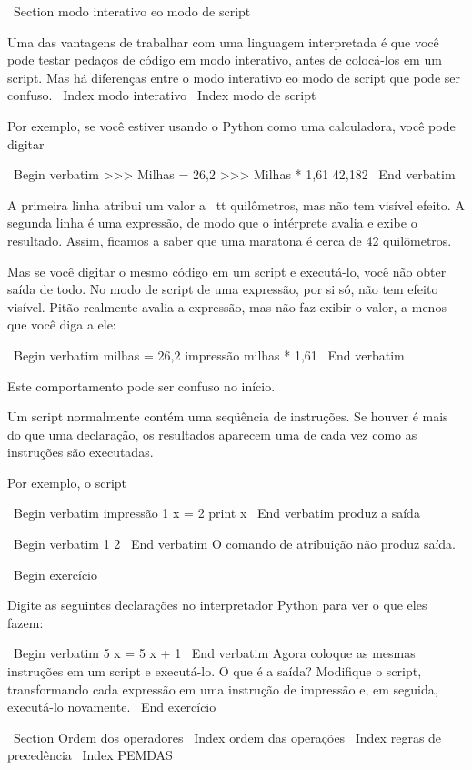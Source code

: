 \documentclass[10pt]{book}
\begin{document}
{\ Section {modo interativo eo modo de script}

Uma das vantagens de trabalhar com uma linguagem interpretada é que
você pode testar pedaços de código em modo interativo, antes de colocá-los
em um script. Mas há diferenças entre o modo interativo
eo modo de script que pode ser confuso.
\ Index {modo interativo}
\ Index {modo de script}

Por exemplo, se você estiver usando o Python como uma calculadora, você pode digitar

\ Begin {verbatim}
>>> Milhas = 26,2
>>> Milhas * 1,61
42,182
\ End {verbatim}

A primeira linha atribui um valor a {\ tt quilômetros}, mas não tem visível
efeito. A segunda linha é uma expressão, de modo que o intérprete
avalia e exibe o resultado. Assim, ficamos a saber que uma maratona é
cerca de 42 quilômetros.

Mas se você digitar o mesmo código em um script e executá-lo, você não obter
saída de todo. No modo de script de uma expressão, por si só, não tem
efeito visível. Pitão realmente avalia a expressão, mas não faz
exibir o valor, a menos que você diga a ele:

\ Begin {verbatim}
milhas = 26,2
impressão milhas * 1,61
\ End {verbatim}

Este comportamento pode ser confuso no início.

Um script normalmente contém uma seqüência de instruções. Se houver
é mais do que uma declaração, os resultados aparecem uma de cada vez
como as instruções são executadas.

Por exemplo, o script

\ Begin {verbatim}
impressão 1
x = 2
print x
\ End {verbatim}
%
produz a saída

\ Begin {verbatim}
1
2
\ End {verbatim}
%
O comando de atribuição não produz saída.

\ Begin {} exercício

Digite as seguintes declarações no interpretador Python para ver
o que eles fazem:

\ Begin {verbatim}
5
x = 5
x + 1
\ End {verbatim}
%
Agora coloque as mesmas instruções em um script e executá-lo. O que
é a saída? Modifique o script, transformando cada
expressão em uma instrução de impressão e, em seguida, executá-lo novamente.
\ End {} exercício


\ Section {Ordem dos operadores}
\ Index {ordem das operações}
\ Index {regras de precedência}
\ Index {} PEMDAS

}
\end{document}

